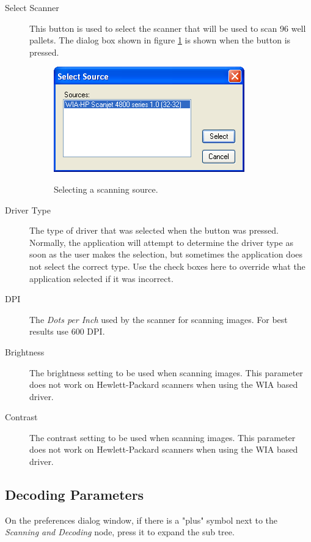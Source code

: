\begin{description}
  \item[Select Scanner] This button is used to select the scanner that will be
    used to scan 96 well pallets. The dialog box shown in figure
    \ref{fig:prefs_select_source} is shown when the button is pressed.
    \begin{figure}[H]
      \centering
      \scalebox{0.5}
      { \includegraphics*{screenshots/configuration/prefs_select_source} }
      \caption{Selecting a scanning source.}
      \label{fig:prefs_select_source}
    \end{figure}
  \item[Driver Type] The type of driver that was selected when the  button was pressed. Normally, the application will attempt to
    determine the driver type as soon as the user makes the selection, but
    sometimes the application does not select the correct type. Use the check
    boxes here to override what the application selected if it was incorrect.
  \item[DPI] The \emph{Dots per Inch} used by the scanner for scanning
    images. For best results use 600 DPI.
  \item[Brightness] The brightness setting to be used when scanning
    images. This parameter does not work on Hewlett-Packard scanners when using
    the WIA based driver.
  \item[Contrast] The contrast setting to be used when scanning
    images. This parameter does not work on Hewlett-Packard scanners when using
    the WIA based driver.
\end{description}

\subsection{Decoding Parameters}
On the preferences dialog window, if there is a "plus" symbol next to the
\emph{Scanning and Decoding} node, press it to expand the sub tree.

